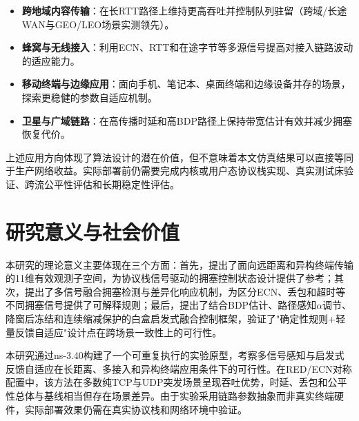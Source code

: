\begin{itemize}
    \item \textbf{跨地域内容传输}：在长RTT路径上维持更高吞吐并控制队列驻留（跨域/长途WAN与GEO/LEO场景实测领先）。
    \item \textbf{蜂窝与无线接入}：利用ECN、RTT和在途字节等多源信号提高对接入链路波动的适应能力。
    \item \textbf{移动终端与边缘应用}：面向手机、笔记本、桌面终端和边缘设备并存的场景，探索更稳健的参数自适应机制。
    \item \textbf{卫星与广域链路}：在高传播时延和高BDP路径上保持带宽估计有效并减少拥塞恢复代价。
\end{itemize}

上述应用方向体现了算法设计的潜在价值，但不意味着本文仿真结果可以直接等同于生产网络收益。实际部署前仍需要完成内核或用户态协议栈实现、真实测试床验证、跨流公平性评估和长期稳定性评估。

\section{研究意义与社会价值}\label{Sec6.4}

本研究的理论意义主要体现在三个方面：首先，提出了面向远距离和异构终端传输的11维有效观测子空间，为协议栈信号驱动的拥塞控制状态设计提供了参考；其次，提出了多信号融合拥塞检测与差异化响应机制，为区分ECN、丢包和超时等不同拥塞信号提供了可解释规则；最后，提出了结合BDP估计、路径感知$\alpha$调节、降窗后冻结和连续缩减保护的白盒启发式融合控制框架，验证了"确定性规则+轻量反馈自适应"设计点在跨场景一致性上的可行性。

本研究通过ns-3.40构建了一个可重复执行的实验原型，考察多信号感知与启发式反馈自适应在长距离、多接入和异构终端应用条件下的可行性。在RED/ECN对称配置中，该方法在多数纯TCP与UDP突发场景呈现吞吐优势，时延、丢包和公平性总体与基线相当但存在场景差异。由于实验采用链路参数抽象而非真实终端硬件，实际部署效果仍需在真实协议栈和网络环境中验证。
